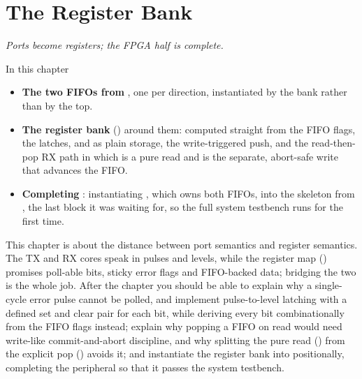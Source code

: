 
\chapter{The Register Bank}
\label{c5:ch}

{\large\itshape Ports become registers; the FPGA half is complete.\par}

\begin{chapterbox}{In this chapter}
\begin{itemize}
  \item \textbf{The two FIFOs from }, one per direction, instantiated by the bank rather
    than by the top.
  \item \textbf{The register bank} () around them:  computed
    straight from the FIFO flags, the  latches,  and  as
    plain storage, the write-triggered  push, and the read-then-pop RX path in which
     is a pure read and  is the separate, abort-safe write that advances
    the FIFO.
  \item \textbf{Completing }: instantiating , which owns both FIFOs,
    into the skeleton from , the last block it was waiting for, so the full system
    testbench runs for the first time.
\end{itemize}
\end{chapterbox}

This chapter is about the distance between port semantics and register semantics. The TX and RX
cores speak in pulses and levels, while the register map () promises poll-able
bits, sticky error flags and FIFO-backed data; bridging the two is the whole job. After the chapter
you should be able to explain why a single-cycle error pulse cannot be polled, and implement
pulse-to-level latching with a defined set and clear pair for each  bit, while
deriving every  bit combinationally from the FIFO flags instead; explain why popping a
FIFO on read would need write-like commit-and-abort discipline, and why splitting the pure read
() from the explicit pop () avoids it; and instantiate the register bank
into  positionally, completing the peripheral so that it passes the system
testbench.

